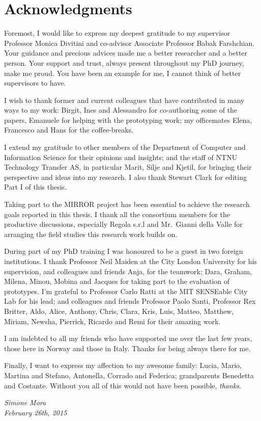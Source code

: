 \chapter{Acknowledgments}
\enlargethispage{\baselineskip}

Foremost, I would like to express my deepest gratitude to my supervisor Professor Monica Divitini and co-advisor Associate Professor Babak Farshchian. Your guidance and precious advices made me a better researcher and a better person. Your support and trust, always present throughout my PhD journey, make me proud. You have been an example for me, I cannot think of better supervisors to have.

I wish to thank former and current colleagues that have contributed in many ways to my work: Birgit, Ines and Alessandro for co-authoring some of the papers, Emanuele for helping with the prototyping work; my officemates Elena, Francesco and Hans for the coffee-breaks. 

I extend my gratitude to other members of the Department of Computer and Information Science for their opinions and insights; and the staff of NTNU Technology Transfer AS, in particular Marit, Silje and Kjetil, for bringing their perspective and ideas into my research. I also thank Stewart Clark for editing Part I of this thesis.

Taking part to the MIRROR project has been essential to achieve the research goals reported in this thesis. I thank all the consortium members for the productive discussions, especially Regola s.r.l and Mr.\ Gianni della Valle for arranging the field studies this research work builds on.

During part of my PhD training I was honoured to be a guest in two foreign institutions. I thank Professor Neil Maiden at the City London University for his supervision, and colleagues and friends Anja, for the teamwork; Dara, Graham, Milena, Minou, Mobina and Jacques for taking part to the evaluation of prototypes. I'm grateful to Professor Carlo Ratti at the MIT SENSEable City Lab for his lead; and colleagues and friends Professor Paolo Santi, Professor Rex Britter, Aldo, Alice, Anthony, Chris, Clara, Kris, Luis, Matteo, Matthew, Miriam, Newsha, Pierrick, Ricardo and Remi for their amazing work.    

I am indebted to all my friends who have supported me over the last few years, those here in Norway and those in Italy. Thanks for being always there for me.

Finally, I want to express my affection to my awesome family: Lucia, Mario, Martina and Stefano, Antonella, Corrado and Federica; grandparents Benedetta and Costante. Without you all of this would not have been possible, \emph{thanks}.

\begin{flushright}
\emph{\small Simone Mora}\\\emph{\small February 26th, 2015}	
\end{flushright}


